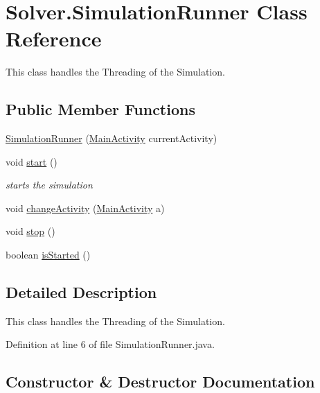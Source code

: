 \hypertarget{classSolver_1_1SimulationRunner}{}\section{Solver.\+Simulation\+Runner Class Reference}
\label{classSolver_1_1SimulationRunner}


This class handles the Threading of the Simulation.  


\subsection*{Public Member Functions}
\begin{DoxyCompactItemize}
\item 
\hyperlink{classSolver_1_1SimulationRunner_a58f6020d625c60b8a04329eced280ca9}{Simulation\+Runner} (\hyperlink{classwavesimulator_1_1MainActivity}{Main\+Activity} current\+Activity)
\item 
void \hyperlink{classSolver_1_1SimulationRunner_ab34c984e38253223884911c042175426}{start} ()
\begin{DoxyCompactList}\small\item\em starts the simulation \end{DoxyCompactList}\item 
void \hyperlink{classSolver_1_1SimulationRunner_ab44a9a2edd9aec16fe26bb05fa0f1115}{change\+Activity} (\hyperlink{classwavesimulator_1_1MainActivity}{Main\+Activity} a)
\item 
void \hyperlink{classSolver_1_1SimulationRunner_a9b9b7707ac2d73e32cc86d3d0a609dde}{stop} ()
\item 
boolean \hyperlink{classSolver_1_1SimulationRunner_a6b7b251488a9854ee2221e3fd37e4c26}{is\+Started} ()
\end{DoxyCompactItemize}


\subsection{Detailed Description}
This class handles the Threading of the Simulation. 

Definition at line 6 of file Simulation\+Runner.\+java.



\subsection{Constructor \& Destructor Documentation}
